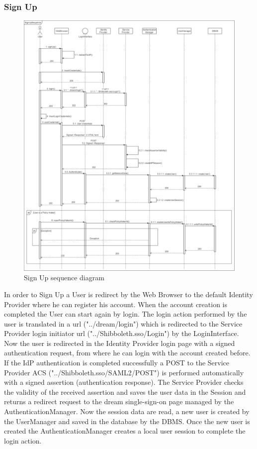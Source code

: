 \newpage
\subsubsection{Sign Up}

\begin{figure}[h!]
        \centering
        \includegraphics[scale=0.23]{images/runtime_view/signup_runtime_view_diagram.png}
        \caption{Sign Up sequence diagram}
        \label{fig:sign_up_sequence_diagram}
\end{figure}
\FloatBarrier
In order to Sign Up a User is redirect by the Web Browser to the default Identity Provider where he can register his account. When the account creation is completed the User can start again by login. The login action performed by the user is translated in a url ("../dream/login") which is redirected to the Service Provider login initiator url ("../Shibboleth.sso/Login") by the LoginInterface. Now the user is redirected in the Identity Provider login page with a signed authentication request, from where he can login with the account created before. If the IdP authentication is completed successfully a POST to the Service Provider ACS ("../Shibboleth.sso/SAML2/POST") is performed automatically with a signed assertion (authentication response). The Service Provider checks the validity of the received assertion and saves the user data in the Session and returns a redirect request to the dream single-sign-on page managed by the AuthenticationManager. Now the session data are read, a new user is created by the UserManager and saved in the database by the DBMS. Once the new user is created the AuthenticationManager creates a local user session to complete the login action.
